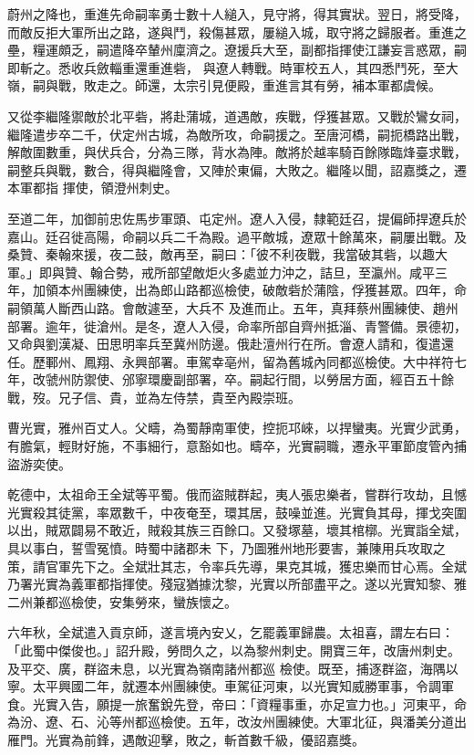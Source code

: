 \begin{pinyinscope}
 蔚州之降也，重進先命嗣率勇士數十人縋入，見守將，得其實狀。翌日，將受降，而敵反拒大軍所出之路，遂與鬥，殺傷甚眾，屢縋入城，取守將之歸服者。重進之壘，糧運頗乏，嗣遣降卒輦州廩濟之。遼援兵大至，副都指揮使江謙妄言惑眾，嗣即斬之。悉收兵斂輜重還重進砦，
 與遼人轉戰。時軍校五人，其四悉鬥死，至大嶺，嗣與戰，敗走之。師還，太宗引見便殿，重進言其有勞，補本軍都虞候。



 又從李繼隆禦敵於北平砦，將赴蒲城，道遇敵，疾戰，俘獲甚眾。又戰於鸞女祠，繼隆遣步卒二千，伏定州古城，為敵所攻，命嗣援之。至唐河橋，嗣扼橋路出戰，解敵圍數重，與伏兵合，分為三隊，背水為陣。敵將於越率騎百餘隊臨烽臺求戰，嗣整兵與戰，數合，得與繼隆會，又陣於東偏，大敗之。繼隆以聞，詔嘉獎之，遷本軍都指
 揮使，領澄州刺史。



 至道二年，加御前忠佐馬步軍頭、屯定州。遼人入侵，隸範廷召，提偏師捍遼兵於嘉山。廷召徙高陽，命嗣以兵二千為殿。過平敵城，遼眾十餘萬來，嗣屢出戰。及桑贊、秦翰來援，夜二鼓，敵再至，嗣曰：「彼不利夜戰，我當破其砦，以趣大軍。」即與贊、翰合勢，戒所部望敵炬火多處並力沖之，詰旦，至瀛州。咸平三年，加領本州團練使，出為郎山路都巡檢使，破敵砦於蒲陰，俘獲甚眾。四年，命嗣領萬人斷西山路。會敵遽至，大兵不
 及進而止。五年，真拜蔡州團練使、趙州部署。逾年，徙滄州。是冬，遼人入侵，命率所部自齊州抵淄、青警備。景德初，又命與劉漢凝、田思明率兵至冀州防邊。俄赴澶州行在所。會遼人請和，復遣還任。歷鄆州、鳳翔、永興部署。車駕幸亳州，留為舊城內同都巡檢使。大中祥符七年，改虢州防禦使、邠寧環慶副部署，卒。嗣起行間，以勞居方面，經百五十餘戰，歿。兄子信、貴，並為左侍禁，貴至內殿崇班。



 曹光實，雅州百丈人。父疇，為蜀靜南軍使，控扼邛崍，以捍蠻夷。光實少武勇，有膽氣，輕財好施，不事細行，意豁如也。疇卒，光實嗣職，遷永平軍節度管內捕盜游奕使。



 乾德中，太祖命王全斌等平蜀。俄而盜賊群起，夷人張忠樂者，嘗群行攻劫，且憾光實殺其徒黨，率眾數千，中夜奄至，環其居，鼓噪並進。光實負其母，揮戈突圍以出，賊眾闢易不敢近，賊殺其族三百餘口。又發塚墓，壞其棺槨。光實詣全斌，具以事白，誓雪冤憤。時蜀中諸郡未
 下，乃圖雅州地形要害，兼陳用兵攻取之策，請官軍先下之。全斌壯其志，令率兵先導，果克其城，獲忠樂而甘心焉。全斌乃署光實為義軍都指揮使。殘寇猶據沈黎，光實以所部盡平之。遂以光實知黎、雅二州兼都巡檢使，安集勞來，蠻族懷之。



 六年秋，全斌遣入貢京師，遂言境內安乂，乞罷義軍歸農。太祖喜，謂左右曰：「此蜀中傑俊也。」詔升殿，勞問久之，以為黎州刺史。開寶三年，改唐州刺史。及平交、廣，群盜未息，以光實為嶺南諸州都巡
 檢使。既至，捕逐群盜，海隅以寧。太平興國二年，就遷本州團練使。車駕征河東，以光實知威勝軍事，令調軍食。光實入告，願提一旅奮銳先登，帝曰：「資糧事重，亦足宣力也。」河東平，命為汾、遼、石、沁等州都巡檢使。五年，改汝州團練使。大軍北征，與潘美分道出雁門。光實為前鋒，遇敵迎擊，敗之，斬首數千級，優詔嘉獎。




\end{pinyinscope}
